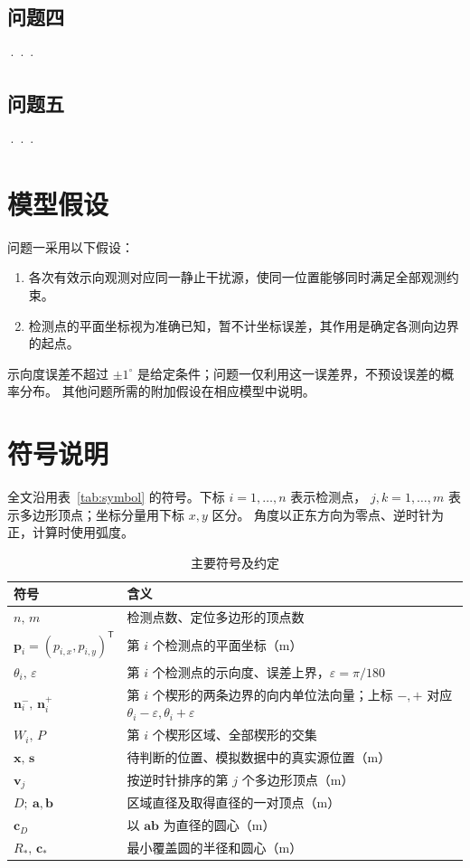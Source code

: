 \documentclass[UTF8,a4paper,12pt]{ctexart}
\begin{document}
\subsection{问题四}
···
\subsection{问题五}
···


\section{模型假设}



问题一采用以下假设：
\begin{enumerate}
  \item 各次有效示向观测对应同一静止干扰源，使同一位置能够同时满足全部观测约束。
  \item 检测点的平面坐标视为准确已知，暂不计坐标误差，其作用是确定各测向边界的起点。
\end{enumerate}
示向度误差不超过 $\pm1^\circ$ 是给定条件；问题一仅利用这一误差界，不预设误差的概率分布。
其他问题所需的附加假设在相应模型中说明。



\section{符号说明}
全文沿用表~\ref{tab:symbol} 的符号。下标 $i=1,\ldots,n$ 表示检测点，
$j,k=1,\ldots,m$ 表示多边形顶点；坐标分量用下标 $x,y$ 区分。
角度以正东方向为零点、逆时针为正，计算时使用弧度。
\begin{table}[htbp]
  \centering
  \caption{主要符号及约定}
  \label{tab:symbol}
  \label{tab:q1-symbols}
  \begin{tabularx}{\linewidth}{lX}
    \toprule
    符号 & 含义 \\
    \midrule
    $n,\,m$ & 检测点数、定位多边形的顶点数 \\
    $\boldsymbol p_i=(p_{i,x},p_{i,y})^{\mathsf T}$ & 第 $i$ 个检测点的平面坐标（$\mathrm m$） \\
    $\theta_i,\,\varepsilon$ & 第 $i$ 个检测点的示向度、误差上界，$\varepsilon=\pi/180$ \\
    $\boldsymbol n_i^-,\,\boldsymbol n_i^+$ & 第 $i$ 个楔形的两条边界的向内单位法向量；上标 $-,+$ 对应 $\theta_i-\varepsilon,\theta_i+\varepsilon$ \\
    $W_i,\,P$ & 第 $i$ 个楔形区域、全部楔形的交集 \\
    $\boldsymbol x,\,\boldsymbol s$ & 待判断的位置、模拟数据中的真实源位置（$\mathrm m$） \\
    $\boldsymbol v_j$ & 按逆时针排序的第 $j$ 个多边形顶点（$\mathrm m$） \\
    $D;\ \boldsymbol a,\boldsymbol b$ & 区域直径及取得直径的一对顶点（$\mathrm m$） \\
    $\boldsymbol c_D$ & 以 $\boldsymbol a\boldsymbol b$ 为直径的圆心（$\mathrm m$） \\
    $R_*,\,\boldsymbol c_*$ & 最小覆盖圆的半径和圆心（$\mathrm m$） \\
    \bottomrule
  \end{tabularx}
\end{table}
\end{document}
